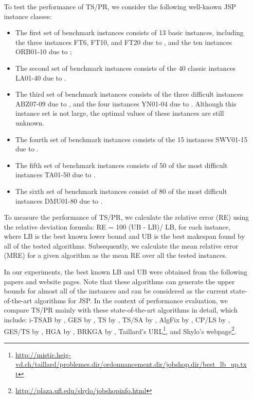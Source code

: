 \documentclass[authoryear,12pt]{elsarticle}
\begin{document}
To test the performance of TS/PR, we consider the following well-known JSP instance classes:

\begin{itemize}
  \item The first set of benchmark instances consists of 13 basic instances, including the three instances FT6, FT10, and FT20 due to \cite{Fisher1963FT06-20}, and the ten instances ORB01-10 due to \cite{ApplegateSpring1991ORB01-10};
  \item The second set of benchmark instances consists of the 40 classic instances LA01-40 due to \cite{Lawrence1984LA01-40}.
  \item The third set of benchmark instances consists of the three difficult instances ABZ07-09 due to \cite{Adams1988LA01-40}, and the four instances YN01-04 due to \cite{Yamada1992YN1-4}. Although this instance set is not large, the optimal values of these instances are still unknown.
  \item The fourth set of benchmark instances consists of the 15 instances SWV01-15 due to \cite{Storer1992SWV01-15}.
  \item The fifth set of benchmark instances consists of 50 of the most difficult instances TA01-50 due to \cite{TaillardSpring1994TA01-50}.
  \item The sixth set of benchmark instances consist of 80 of the most difficult instances DMU01-80 due to \cite{Demirkol1997DMU01-80}.
\end{itemize}


To measure the performance of TS/PR, we calculate the relative error (RE) using the relative deviation formula: RE = 100  (UB - LB)/ LB, for each instance, where LB is the best known lower bound and UB is the best makespan found by all of the tested algorithms. Subsequently, we calculate the mean relative error (MRE) for a given algorithm as the mean RE over all the tested instances.

In our experiments, the best known LB and UB were obtained from the following papers and website pages. Note that these algorithms can generate the upper bounds for almost all of the instances and can be considered as the current state-of-the-art algorithms for JSP. In the context of performance evaluation, we compare TS/PR mainly with these state-of-the-art algorithms in detail, which include: i-TSAB by \cite{Nowicki2005i-TSAB},
GES by \cite{Pardalos2006GES}, TS by \cite{Zhang2007TS}, TS/SA by \cite{Zhang2008TSSA}, AlgFix by \cite{Pardalos2010AlgFix}, CP/LS by \cite{Beck2011CP/LS}, GES/TS by \cite{Nasiri2012GES/TS}, HGA by \cite{Qing-dao-er-ji2012HGA}, BRKGA by \cite{Goncalves2013BRKGA}, Taillard's URL\footnote{\url{http://mistic.heig-vd.ch/taillard/problemes.dir/ordonnancement.dir/jobshop.dir/best_lb_up.txt}}, and Shylo's webpage\footnote{\url{http://plaza.ufl.edu/shylo/jobshopinfo.html}}.
\end{document}
